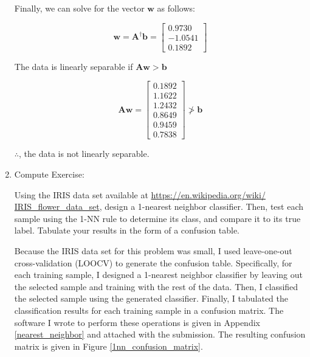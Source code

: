 \documentclass[fleqn]{article}
\begin{document}
\begin{enumerate}
		Finally, we can solve for the vector $\mathbf{w}$ as follows:
		
		\begin{equation*}
			\mathbf{w} = \mathbf{A}^{\dag}\mathbf{b} = \begin{bmatrix} 0.9730 \\ -1.0541 \\ 0.1892 \end{bmatrix}
		\end{equation*}
		
		The data is linearly separable if $\mathbf{A}\mathbf{w} > \mathbf{b}$
		
		\begin{equation*}
			\mathbf{A}\mathbf{w} = \begin{bmatrix}
				0.1892 \\
    				1.1622 \\
   	 			1.2432 \\
    				0.8649 \\
    				0.9459 \\
    				0.7838
			\end{bmatrix} \ngtr \mathbf{b}
		\end{equation*}
		
		$\therefore$, the data is not linearly separable.
		
		\item Compute Exercise:
		
		Using the IRIS data set available at \href{https://en.wikipedia.org/wiki/IRIS_flower_data_set}{https://en.wikipedia.org/wiki/\\IRIS\_flower\_data\_set}, design a 1-nearest neighbor classifier. Then, test each sample using the 1-NN rule to determine its class, and compare it to its true label. Tabulate your results in the form of a confusion table.
		
		Because the IRIS data set for this problem was small, I used leave-one-out cross-validation (LOOCV) to generate the confusion table. Specifically, for each training sample, I designed a 1-nearest neighbor classifier by leaving out the selected sample and training with the rest of the data. Then, I classified the selected sample using the generated classifier. Finally, I tabulated the classification results for each training sample in a confusion matrix. The software I wrote to perform these operations is given in Appendix \ref{nearest_neighbor} and attached with the submission. The resulting confusion matrix is given in Figure \ref{1nn_confusion_matrix}.
		

\end{enumerate}
\end{document}
